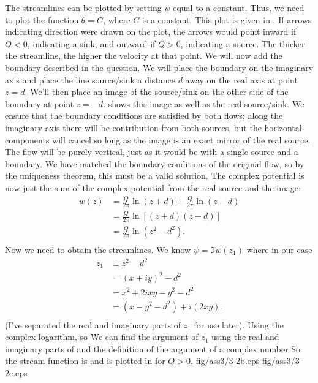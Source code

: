 \documentclass[12pt]{book}
\begin{document}
{The streamlines can be plotted by setting $\psi$ equal to a constant.  Thus, we need to plot the function $\theta = C$, where $C$ is a constant.  This plot is given in .  If arrows indicating direction were drawn on the plot, the arrows would point inward if $Q<0$, indicating a sink, and outward if $Q>0$, indicating a source.  The thicker the streamline, the higher the velocity at that point.  We will now add the boundary described in the question.  We will place the boundary on the imaginary axis and place the line source/sink a distance $d$ away on the real axis at point $z=d$. We'll then place an image of the source/sink on the other side of the boundary at point $z = -d$.    shows this image as well as the real source/sink.  We ensure that the boundary conditions are satisfied by both flows; along the imaginary axis there will be contribution from both sources, but the horizontal components will cancel so long as the image is an exact mirror of the real source. The flow will be purely vertical, just as it would be with a single source and a boundary. We have matched the boundary conditions of the original flow, so by the uniqueness theorem, this must be a valid solution. The complex potential is now just the sum of the complex potential from the real source and the image:
\begin{align*}
w(z) &= \frac{Q}{2\pi}\ln\left(z+d\right) + \frac{Q}{2\pi}\ln\left(z-d\right) \\
& = \frac{Q}{2\pi}\ln\left[\left(z+d\right)\left(z-d\right)\right] \\
& = \frac{Q}{2\pi}\ln\left(z^2 - d^2\right) .\\
\end{align*}
Now we need to obtain the streamlines.  We know $\psi = \Im{w(z_1)}$ where in our case 
\begin{equation}
\begin{aligned}\label{problem3-2realcomplexZ}
z_1 &\equiv z^2 -d^2 \\
&= (x + iy)^2 - d^2 \\
&= x^2 + 2ixy - y^2 - d^2 \\
&= (x - y^2 - d^2) + i(2xy). \\
\end{aligned}
\end{equation}
(I've separated the real and imaginary parts of $z_1$ for use later).  Using the complex logarithm, 
so
We can find the argument of $z_1$ using the real and imaginary parts of  and the definition of the argument of a complex number
So the stream function is
and is plotted in  for $Q>0$.
{fig/ass3/3-2b.eps}
{fig/ass3/3-2c.eps}
}
\end{document}
